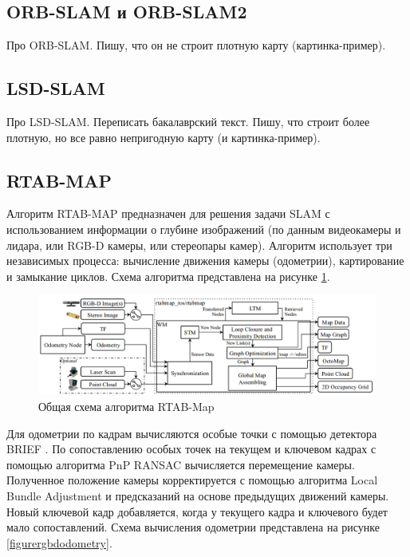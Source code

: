 \documentclass{mipt-thesis-ms}
\begin{document}
	\subsection{ORB-SLAM и ORB-SLAM2}
	
	Про ORB-SLAM. Пишу, что он не строит плотную карту (картинка-пример).
	
	\subsection{LSD-SLAM}
	
	Про LSD-SLAM. Переписать бакалаврский текст. Пишу, что строит более плотную, но все равно непригодную карту (и картинка-пример).
	
	\subsection{RTAB-MAP}
	
	Алгоритм RTAB-MAP \cite{labbe2011memory} предназначен для решения задачи SLAM с использованием информации о глубине изображений (по данным видеокамеры и лидара, или RGB-D камеры, или стереопары камер). Алгоритм использует три независимых процесса: вычисление движения камеры (одометрии), картирование и замыкание циклов. Схема алгоритма представлена на рисунке \ref{figurertabmap}.
	
	\begin{figure}
		\centering
		\includegraphics[scale=0.4]{img/rtabmap_scheme.png}
		\caption{Общая схема алгоритма RTAB-Map}
		\label{figurertabmap}
	\end{figure}
	
	Для одометрии по кадрам вычисляются особые точки с помощью детектора BRIEF \cite{calonder2010brief}. По сопоставлению особых точек на текущем и ключевом кадрах с помощью алгоритма PnP RANSAC \cite{brachmann2017dsac} вычисляется перемещение камеры. Полученное положение камеры корректируется с помощью алгоритма Local Bundle Adjustment \cite{zhang2006incremental} и предсказаний на основе предыдущих движений камеры. Новый ключевой кадр добавляется, когда у текущего кадра и ключевого будет мало сопоставлений. Схема вычисления одометрии представлена на рисунке \ref{figurergbdodometry}.
	
\end{document}
